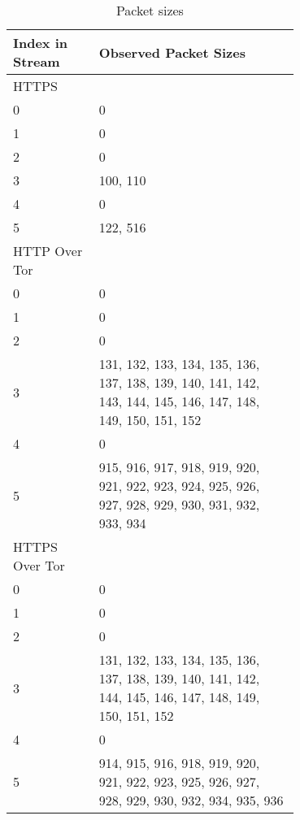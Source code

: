 \begin{table}[H]
  \begin{tabular*}{\linewidth}{lp{0.7\linewidth}}
    \toprule
    Index in Stream & Observed Packet Sizes\\
    \midrule
    HTTPS\\
    \midrule
    0 & 0\\
    1 & 0\\
    2 & 0\\
    3 & 100, 110\\
    4 & 0\\
    5 & 122, 516\\
    \midrule
    HTTP Over Tor\\
    \midrule
    0 & 0\\
    1 & 0\\
    2 & 0\\
    3 & 131, 132, 133, 134, 135, 136, 137, 138, 139, 140, 141, 142, 143, 144, 145, 146, 147, 148, 149, 150, 151, 152\\
    4 & 0\\
    5 & 915, 916, 917, 918, 919, 920, 921, 922, 923, 924, 925, 926, 927, 928, 929, 930, 931, 932, 933, 934\\
    \midrule
    HTTPS Over Tor\\
    \midrule
    0 & 0\\
    1 & 0\\
    2 & 0\\
    3 & 131, 132, 133, 134, 135, 136, 137, 138, 139, 140, 141, 142, 144, 145, 146, 147, 148, 149, 150, 151, 152\\
    4 & 0\\
    5 & 914, 915, 916, 918, 919, 920, 921, 922, 923, 925, 926, 927, 928, 929, 930, 932, 934, 935, 936\\
    \bottomrule
  \end{tabular*}
  \caption{Packet sizes} \label{table:packet_sizes}
\end{table}
